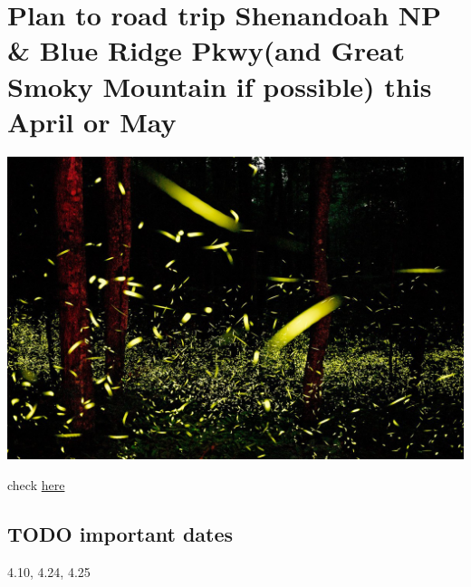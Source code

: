 \documentclass[11pt]{article}
\date{\today}
\title{}
\begin{document}
\tableofcontents

\section{Plan to road trip Shenandoah NP \& Blue Ridge Pkwy(and Great Smoky Mountain if possible) this April or May}
\label{sec:orgheadline2}
\includegraphics[width=.9\linewidth]{./fireflies-great-smoky-mountains.jpg}

check \href{http://www.heysmokies.com/synchronous-fireflies-in-great-smoky-mountains-june-2016/}{here}

\subsection{{\bfseries\sffamily TODO} important dates}
\label{sec:orgheadline1}
4.10, 4.24, 4.25
\end{document}
